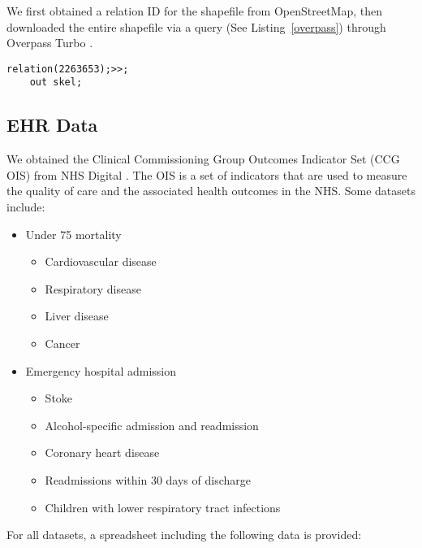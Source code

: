 We first obtained a relation ID for the shapefile from OpenStreetMap, then downloaded the entire shapefile via a query (See Listing~\ref{overpass}) through Overpass Turbo \cite{overpassturboOverpass}.

\begin{lstlisting}[caption={The query that downloads the shapefile of River Thames from OpenStreetMap via Overpass Turbo API.}, label={overpass},captionpos=b]
    relation(2263653);>>;
    out skel;
\end{lstlisting}

\subsection{EHR Data}

We obtained the Clinical Commissioning Group Outcomes Indicator Set (CCG OIS) from NHS Digital \cite{nhsdigitalClinical}. The OIS is a set of indicators that are used to measure the quality of care and the associated health outcomes in the NHS. Some datasets include:
\begin{itemize}
    \item Under 75 mortality
    \begin{multicols}{2}
        \begin{itemize}
            \item Cardiovascular disease
            \item Respiratory disease
            \item Liver disease
            \item Cancer
        \end{itemize}
    \end{multicols}
    \item Emergency hospital admission
        \begin{itemize}
            \item Stoke
            \item Alcohol-specific admission and readmission
            \item Coronary heart disease
            \item Readmissions within 30 days of discharge
            \item Children with lower respiratory tract infections
        \end{itemize}
\end{itemize}

For all datasets, a spreadsheet including the following data is provided:

